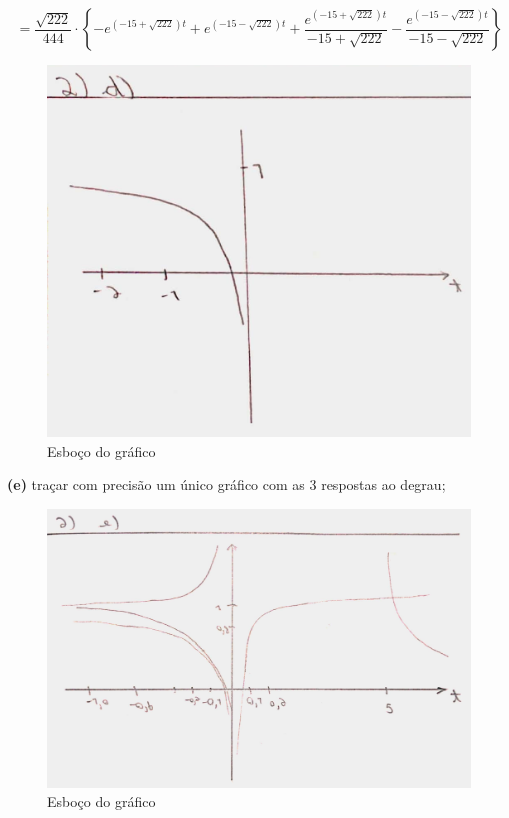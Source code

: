 \documentclass{article}
\begin{document}
\[ = \frac{\sqrt{222}}{444} \cdot \left\{ - e^{(-15+\sqrt{222})t} + e^{(-15-\sqrt{222})t} + \frac{e^{(-15+\sqrt{222})t}}{-15+\sqrt{222}} - \frac{e^{(-15-\sqrt{222})t}}{-15-\sqrt{222}} \right\} \]

\begin{figure}[h]
    \includegraphics[scale=0.21]{Q2_d.png}
    \centering
    \caption{Esboço do gráfico}
\end{figure}

\vspace{\baselineskip}

\newpage

\textbf{(e)} traçar com precisão um único gráfico com as 3 respostas ao degrau;

\begin{figure}[h]
    \includegraphics[scale=0.21]{Q2_e.png}
    \centering
    \caption{Esboço do gráfico}
\end{figure}
\end{document}
